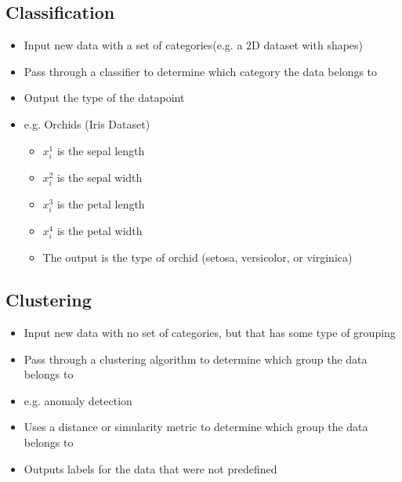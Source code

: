 \documentclass[12pt]{article}
\begin{document}
        \subsection{Classification}
            \begin{itemize}
                \item Input new data with a set of categories(e.g. a 2D dataset with shapes)
                \item Pass through a classifier to determine which category the data belongs to
                \item Output the type of the datapoint
                \item e.g. Orchids (Iris Dataset)
                \begin{itemize}
                    \item $x_i^1$ is the sepal length
                    \item $x_i^2$ is the sepal width
                    \item $x_i^3$ is the petal length
                    \item $x_i^4$ is the petal width
                    \item The output is the type of orchid (setosa, versicolor, or virginica)
                \end{itemize}
            \end{itemize}
        \subsection{Clustering}
            \begin{itemize}
                \item Input new data with no set of categories, but that has some type of grouping
                \item Pass through a clustering algorithm to determine which group the data belongs to
                \item e.g. anomaly detection
                \item Uses a distance or simularity metric to determine which group the data belongs to
                \item Outputs labels for the data that were not predefined
            \end{itemize}
\end{document}
